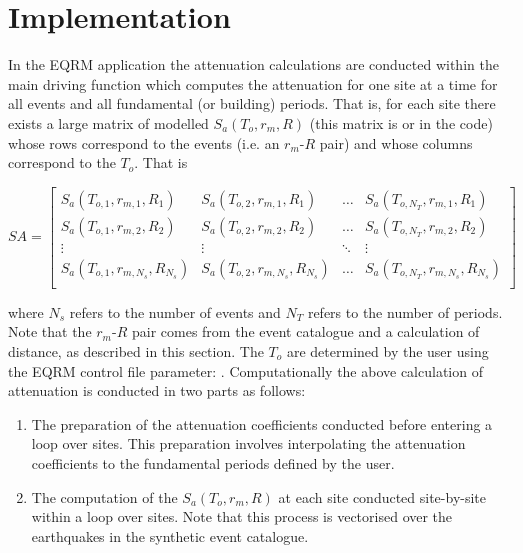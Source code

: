 \section{Implementation}\label{sec:implementation} In the EQRM
application the attenuation calculations are conducted within the
main driving function  which computes the
attenuation for one site at a time for all events and all
fundamental (or building) periods. That is, for each site there
exists a large matrix of modelled $S_a(T_o,r_m,R)$ (this matrix is
 or  in the code) whose rows
correspond to the events (i.e. an $r_m$-$R$ pair) and whose columns
correspond to the $T_o$. That is

\begin{math}
 SA = \left[ \begin{array}{ccccc}
S_a(T_{o,1},r_{m,1},R_1) & S_a(T_{o,2},r_{m,1},R_1) &  \hdots & S_a(T_{o,N_T},r_{m,1},R_1) \\
S_a(T_{o,1},r_{m,2},R_2) & S_a(T_{o,2},r_{m,2},R_2) &  \hdots & S_a(T_{o,N_T},r_{m,2},R_2) \\
\vdots & \vdots &  \ddots & \vdots \\
S_a(T_{o,1},r_{m,N_s},R_{N_s}) & S_a(T_{o,2},r_{m,N_s},R_{N_s}) & \hdots & S_a(T_{o,N_T},r_{m,N_s},R_{N_s}) \\
\end{array} \right]
\end{math}

where $N_s$ refers to the number of events and $N_T$ refers to the
number of periods. Note that the $r_m$-$R$ pair comes from the event
catalogue and a calculation of distance, as described in this
section. The $T_o$ are determined by the user using the EQRM control
file parameter: . Computationally the above
calculation of attenuation is conducted in two parts as follows:
\begin{enumerate}
\item The preparation of the attenuation coefficients
conducted before entering a loop over sites. This preparation
involves interpolating the attenuation coefficients to the
fundamental periods defined by the user. \item The computation of
the $S_a(T_o,r_m,R)$ at each site conducted site-by-site within a
loop over sites. Note that this process is vectorised over the
earthquakes in the synthetic event catalogue.
\end{enumerate}


